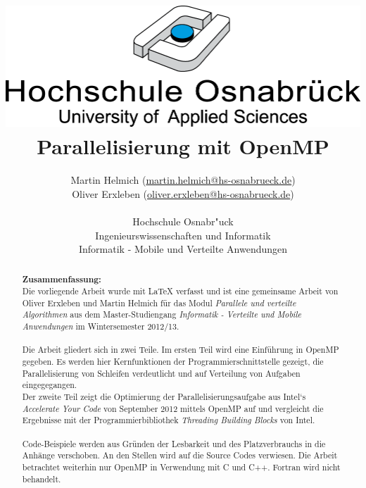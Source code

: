 \documentclass[11pt]{scrartcl}
\begin{document}
\author{%
	Martin Helmich \small(\href{mailto:martin.helmich@hs-osnabrueck.de}{martin.helmich@hs-osnabrueck.de})\\%
	Oliver Erxleben \small(\href{mailto:oliver.erxleben@hs-osnabrueck.de}{oliver.erxleben@hs-osnabrueck.de})\\ \\%
	Hochschule Osnabr"uck \\%
	Ingenieurswissenschaften und Informatik \\%
	Informatik - Mobile und Verteilte Anwendungen }

\title{\includegraphics[scale=0.75,keepaspectratio]{img/hs_os.png}\linebreak \linebreak Parallelisierung mit OpenMP}

\maketitle
\thispagestyle{empty}
\tableofcontents
\listoffigures

\lstlistoflistings

\pagebreak
\thispagestyle{empty}
\begin{abstract}
\textbf{Zusammenfassung:}\\ 
Die vorliegende Arbeit wurde mit LaTeX verfasst und ist eine gemeinsame Arbeit von Oliver Erxleben und Martin Helmich für das Modul \textit{Parallele und verteilte Algorithmen} aus dem Master-Studiengang \textit{Informatik - Verteilte und Mobile Anwendungen} im Wintersemester 2012/13. \\ 
\\
Die Arbeit gliedert sich in zwei Teile. Im ersten Teil wird eine Einführung in OpenMP gegeben. Es werden hier Kernfunktionen der Programmierschnittstelle gezeigt, die Parallelisierung von Schleifen verdeutlicht und auf Verteilung von Aufgaben eingegegangen.\\
Der zweite Teil zeigt die Optimierung der Parallelisierungsaufgabe aus Intel`s \textit{Accelerate Your Code} von September 2012 mittels OpenMP auf und vergleicht die Ergebnisse mit der Programmierbibliothek \textit{Threading Building Blocks} von Intel.\\
\\
Code-Beispiele werden aus Gründen der Lesbarkeit und des Platzverbrauchs in die Anhänge verschoben. An den Stellen wird auf die Source Codes verwiesen. Die Arbeit betrachtet weiterhin nur OpenMP in Verwendung mit C und C++. Fortran wird nicht behandelt.
\end{abstract}
\end{document}
